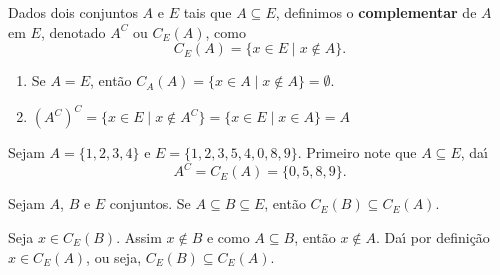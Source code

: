 \begin{definicao}
Dados dois conjuntos $A$ e $E$ tais que $A\subseteq E$, definimos o \textbf{complementar} de $A$ em $E$, denotado $A^C$ ou $C_E(A)$, como
\[
	C_E(A) = \{ x \in E \mid x \notin A \}.
\]
\end{definicao}

\begin{observacoes}
	\begin{enumerate}[label={\arabic*})]
		\item Se $A = E$, ent{\~a}o $C_A(A) = \{ x \in A \mid x \notin A \} = \emptyset$.
		\item $(A^C)^C = \{x \in E \mid x \notin A^C\} = \{ x \in E \mid x \in A \} = A$
	\end{enumerate}
	
\end{observacoes}

\begin{exemplo}
	Sejam $A = \{1,2,3,4\}$ e $E = \{1,2,3,5,4,0,8,9\}$. Primeiro note que $A \subseteq E$, da{\'\i}
	\[
			A^C = C_E(A) = \{0,5,8,9\}.
	\]
\end{exemplo}

\begin{proposicao}
	Sejam $A$, $B$ e $E$ conjuntos. Se $A\subseteq B\subseteq E$, ent{\~a}o $C_E(B)\subseteq C_E(A)$.
\end{proposicao}
\begin{prova}
	Seja $x \in C_E(B)$. Assim $x\notin B$ e como $A \subseteq B$, ent\~ao $x \notin A$. Da{\'\i} por defini\c{c}\~ao $x\in C_E(A)$, ou seja, $C_E(B) \subseteq C_E(A)$.
\end{prova}

